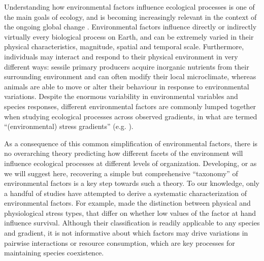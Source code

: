 Understanding how environmental factors influence ecological processes is one of the main goals of ecology, and is becoming increasingly relevant in the context of the ongoing global change \citep{Vitousek1994}. Environmental factors influence directly or indirectly virtually every biological process on Earth, and can be extremely varied in their physical characteristics, magnitude, spatial and temporal scale. Furthermore, individuals may interact and respond to their physical environment in very different ways: sessile primary producers acquire inorganic nutrients from their surrounding environment and can often modify their local microclimate, whereas animals are able to move or alter their behaviour in response to environmental variations. Despite the enormous variability in environmental variables and species responses, different environmental factors are commonly lumped together when studying ecological processes across observed gradients, in what are termed “(environmental) stress gradients” (e.g. \citealt{Hart2013}).

As a consequence of this common simplification of environmental factors, there is no overarching theory predicting how different facets of the environment will influence ecological processes at different levels of organization. Developing, or as we will suggest here, recovering a simple but comprehensive “taxonomy” of environmental factors is a key step towards such a theory. To our knowledge, only a handful of studies have attempted to derive a systematic characterization of environmental factors. For example, \cite{Menge1987} made the distinction between physical and physiological stress types, that differ on whether low values of the factor at hand influence survival. Although their classification is readily applicable to any species and gradient, it is not informative about which factors may drive variations in pairwise interactions or resource consumption, which are key processes for maintaining species coexistence.

